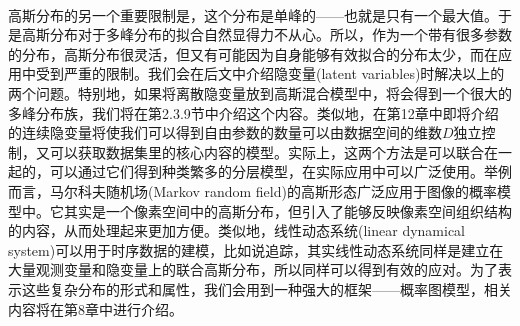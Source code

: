 \documentclass[b5paper]{book}
\numberwithin{equation}{chapter}
\begin{document}
{\begin{figure}[ht]
	\end{figure}
	\\
	\indent 高斯分布的另一个重要限制是，这个分布是单峰的——也就是只有一个最大值。于是高斯分布对于多峰分布的拟合自然显得力不从心。所以，作为一个带有很多参数的分布，高斯分布很灵活，但又有可能因为自身能够有效拟合的分布太少，而在应用中受到严重的限制。我们会在后文中介绍隐变量(latent variables)时解决以上的两个问题。特别地，如果将离散隐变量放到高斯混合模型中，将会得到一个很大的多峰分布族，我们将在第2.3.9节中介绍这个内容。类似地，在第12章中即将介绍的连续隐变量将使我们可以得到自由参数的数量可以由数据空间的维数$D$独立控制，又可以获取数据集里的核心内容的模型。实际上，这两个方法是可以联合在一起的，可以通过它们得到种类繁多的分层模型，在实际应用中可以广泛使用。举例而言，马尔科夫随机场(Markov random field)的高斯形态广泛应用于图像的概率模型中。它其实是一个像素空间中的高斯分布，但引入了能够反映像素空间组织结构的内容，从而处理起来更加方便。类似地，线性动态系统(linear dynamical system)可以用于时序数据的建模，比如说追踪，其实线性动态系统同样是建立在大量观测变量和隐变量上的联合高斯分布，所以同样可以得到有效的应对。为了表示这些复杂分布的形式和属性，我们会用到一种强大的框架——概率图模型，相关内容将在第8章中进行介绍。
	}
\end{document}
